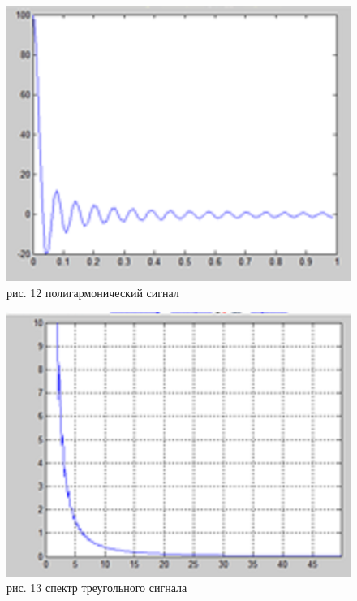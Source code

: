 \documentclass[10pt,a4paper]{report}
\begin{document}
\begin{figure}
\begin{center}
\includegraphics[angle=0, scale = 0.9]{12.png}\newline
рис. 12  полигармонический сигнал\newline
\end{center}
\end{figure}
\begin{figure}
\begin{center}
\includegraphics[angle=0, scale = 0.9]{13.png}\newline
рис. 13   спектр треугольного сигнала\newline
\end{center}
\end{figure}
\end{document}
